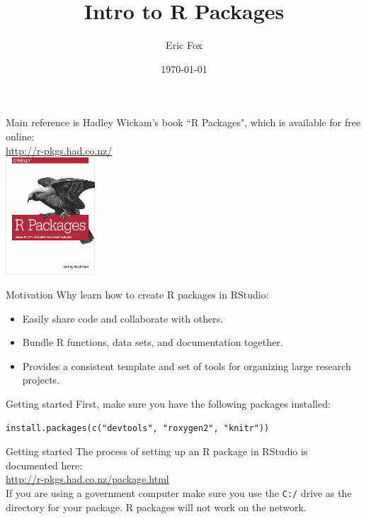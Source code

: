\documentclass{beamer}
\title{Intro to R Packages}
\author{Eric Fox}
\date{\today}
\begin{document}
\frame{\titlepage}

\begin{frame}
Main reference is Hadley Wickam's book ``R Packages", which is available for free online:\\
\vspace{3ex}
\url{http://r-pkgs.had.co.nz/}\\
\vspace{3ex}
\centering
\includegraphics[width=0.25\textwidth]{figure/cover.png}
\end{frame}

\begin{frame}{Motivation}
Why learn how to create R packages in RStudio:
\vspace{1ex}
\begin{itemize}
\item Easily share code and collaborate with others.
\vspace{1ex}
\item Bundle R functions, data sets, and documentation together.
\vspace{1ex}
\item Provides a consistent template and set of tools for organizing large research projects. 
\end{itemize}
\end{frame}

\begin{frame}[fragile]{Getting started}
First, make sure you have the following packages installed:
\begin{verbatim}
install.packages(c("devtools", "roxygen2", "knitr"))
\end{verbatim}
\end{frame}

\begin{frame}{Getting started}
The process of setting up an R package in RStudio is documented here:\\
\vspace{3ex}
\url{http://r-pkgs.had.co.nz/package.html}\\
\vspace{3ex}
If you are using a government computer make sure you use the \texttt{C:/} drive as the directory for your package.  R packages will not work on the network.
\end{frame}
\end{document}
